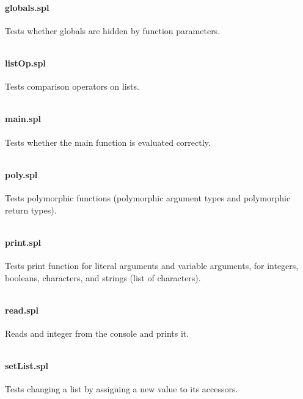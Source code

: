 \documentclass[a4paper]{article}
\begin{document}
\paragraph{globals.spl}
Tests whether globals are hidden by function parameters.
\begin{verbatim}\end{verbatim}

\paragraph{listOp.spl}
Tests comparison operators on lists.
\begin{verbatim}\end{verbatim}

\paragraph{main.spl}
Tests whether the main function is evaluated correctly.
\begin{verbatim}\end{verbatim}

\paragraph{poly.spl}
Tests polymorphic functions (polymorphic argument types and polymorphic return types).
\begin{verbatim}\end{verbatim}

\paragraph{print.spl}
Tests print function for literal arguments and variable arguments, for integers, booleans, characters, and strings (list of characters).
\begin{verbatim}\end{verbatim}

\paragraph{read.spl}
Reads and integer from the console and prints it.
\begin{verbatim}\end{verbatim}

\paragraph{setList.spl}
Tests changing a list by assigning a new value to its accessors.
\begin{verbatim}\end{verbatim}
\end{document}
